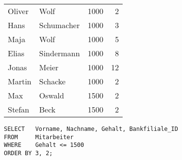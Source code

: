         \begin{center}
          \begin{small}
            \tablehead{}
            \begin{msoraclesql}
              \begin{supertabular}{llrr}
                Oliver & Wolf & 1000 & 2 \\
                Hans & Schumacher & 1000 & 3 \\
                Maja & Wolf & 1000 & 5 \\
                Elias & Sindermann & 1000 & 8 \\
                Jonas & Meier & 1000 & 12 \\
                Martin & Schacke & 1000 & 2 \\
                Max & Oswald & 1500 & 2 \\
                Stefan & Beck & 1500 & 2\\
              \end{supertabular}
            \end{msoraclesql}
          \end{small}
        \end{center}
        \begin{lstlisting}[language=oracle_sql,caption={Die ORDER BY Klausel mit Positionsangaben},label=sql02_16]
SELECT   Vorname, Nachname, Gehalt, Bankfiliale_ID
FROM     Mitarbeiter
WHERE    Gehalt <= 1500
ORDER BY 3, 2;
        \end{lstlisting}
